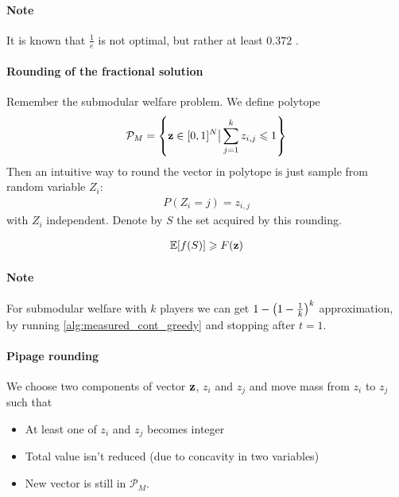 \paragraph{Note} It is known that $\frac{1}{e}$ is not optimal, but rather at least $0.372$ \cite{ene2016constrained}.

\paragraph{Rounding of the fractional solution}
Remember the submodular welfare problem. We define polytope
\begin{align}
\mathcal{P}_M = \qty{ \vb{z} \in [0,1]^N \big\vert \sum_{j=1}^k z_{i,j} \leqslant 1}
\end{align}
Then an intuitive way to round the vector in polytope is just sample from random variable $Z_i$:
\begin{align}
P(Z_i= j) = z_{i,j}
\end{align}
with $Z_i$ independent. Denote by $S$ the set acquired by this rounding.
\begin{prop}
	\begin{align}
	\mathbb{E}\qty[f(S)] \geqslant F(\vb{z})
	\end{align}
\end{prop}

\paragraph{Note} For submodular welfare with $k$ players we can get $1-\qty(1-\frac{1}{k})^k$ approximation, by running \vref{alg:measured_cont_greedy} and stopping after $t=1$.


\paragraph{Pipage rounding}
We choose two components of vector $\vb{z}$, $z_i$ and $z_j$ and move mass from $z_i$ to $z_j$ such that
\begin{itemize}
	\item At least one of  $z_i$ and $z_j$ becomes integer
	\item Total value isn't reduced (due to concavity in two variables)
	\item New vector is still in $\mathcal{P}_M$. 
\end{itemize}